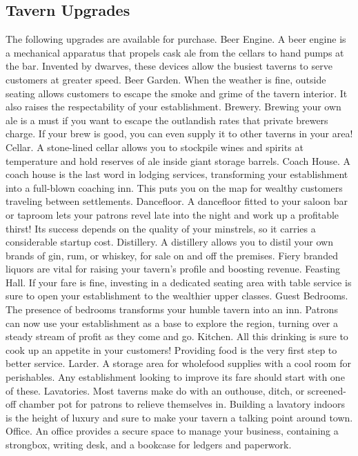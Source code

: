 \documentclass[10pt,a4paper,twoside,twocolumn,openany,bg=print,nodeprecatedcode]{dndbook}
\begin{document}
\subsection{Tavern Upgrades}
The following upgrades are available for purchase.
Beer Engine. A beer engine is a mechanical apparatus that propels cask ale from the cellars to hand pumps at the bar. Invented by dwarves, these devices allow the busiest taverns to serve customers at greater speed.
Beer Garden. When the weather is fine, outside seating allows customers to escape the smoke and grime of the tavern interior. It also raises the respectability of your establishment.
Brewery. Brewing your own ale is a must if you want to escape the outlandish rates that private brewers charge. If your brew is good, you can even supply it to other taverns in your area!
Cellar. A stone-lined cellar allows you to stockpile wines and spirits at temperature and hold reserves of ale inside giant storage barrels.
Coach House. A coach house is the last word in lodging services, transforming your establishment into a full-blown coaching inn. This puts you on the map for wealthy customers traveling between settlements.
Dancefloor. A dancefloor fitted to your saloon bar or taproom lets your patrons revel late into the night and work up a profitable thirst! Its success depends on the quality of your minstrels, so it carries a considerable startup cost.
Distillery. A distillery allows you to distil your own brands of gin, rum, or whiskey, for sale on and off the premises. Fiery branded liquors are vital for raising your tavern's profile and boosting revenue.
Feasting Hall. If your fare is fine, investing in a dedicated seating area with table service is sure to open your establishment to the wealthier upper classes.
Guest Bedrooms. The presence of bedrooms transforms your humble tavern into an inn. Patrons can now use your establishment as a base to explore the region, turning over a steady stream of profit as they come and go.
Kitchen. All this drinking is sure to cook up an appetite in your customers! Providing food is the very first step to better service.
Larder. A storage area for wholefood supplies with a cool room for perishables. Any establishment looking to improve its fare should start with one of these.
Lavatories. Most taverns make do with an outhouse, ditch, or screened-off chamber pot for patrons to relieve themselves in. Building a lavatory indoors is the height of luxury and sure to make your tavern a talking point around town.
Office. An office provides a secure space to manage your business, containing a strongbox, writing desk, and a bookcase for ledgers and paperwork.
\end{document}
